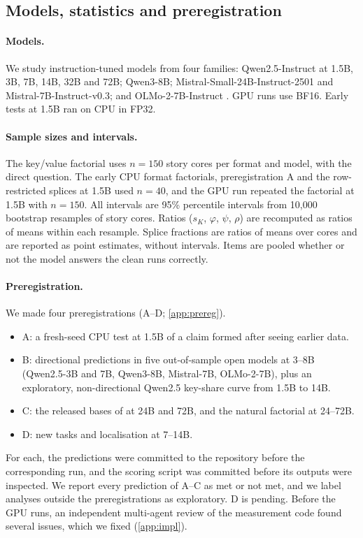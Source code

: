 \subsection{Models, statistics and preregistration}\label{sec:method-stats}

\paragraph{Models.} We study \nModels{} instruction-tuned models from four families: Qwen2.5-Instruct \citep{yang2024qwen25} at 1.5B, 3B, 7B, 14B, 32B and 72B; Qwen3-8B; Mistral-Small-24B-Instruct-2501 \citep{mistral2025small} and Mistral-7B-Instruct-v0.3; and OLMo-2-7B-Instruct \citep{olmo2025two}. GPU runs use BF16. Early tests at 1.5B ran on CPU in FP32.

\paragraph{Sample sizes and intervals.} The key/value factorial uses $n = 150$ story cores per format and model, with the direct question. The early CPU format factorials, preregistration A and the row-restricted splices at 1.5B used $n = 40$, and the GPU run repeated the factorial at 1.5B with $n = 150$. All intervals are 95\% percentile intervals from 10{,}000 bootstrap resamples of story cores. Ratios ($s_K$, $\varphi$, $\psi$, $\rho$) are recomputed as ratios of means within each resample. Splice fractions are ratios of means over cores and are reported as point estimates, without intervals. Items are pooled whether or not the model answers the clean runs correctly.

\paragraph{Preregistration.} We made four preregistrations (A--D; \cref{app:prereg}).
\begin{itemize}\setlength\itemsep{1pt}
  \item A: a fresh-seed CPU test at 1.5B of a claim formed after seeing earlier data.
  \item B: directional predictions in five out-of-sample open models at 3--8B (Qwen2.5-3B and 7B, Qwen3-8B, Mistral-7B, OLMo-2-7B), plus an exploratory, non-directional Qwen2.5 key-share curve from 1.5B to 14B.
  \item C: the released bases of \citet{anonymous2026fitted} at 24B and 72B, and the natural factorial at 24--72B.
  \item D: new tasks and localisation at 7--14B.
\end{itemize}
For each, the predictions were committed to the repository before the corresponding run, and the scoring script was committed before its outputs were inspected. We report every prediction of A--C as met or not met, and we label analyses outside the preregistrations as exploratory. D is pending.  Before the GPU runs, an independent multi-agent review of the measurement code found several issues, which we fixed (\cref{app:impl}).
